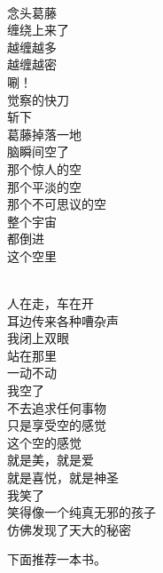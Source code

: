 \begin{poem}[斩]
    \begin{multicols}{4}
        \centering~\\
        念头葛藤 \\ 缠绕上来了 \\ 越缠越多 \\ 越缠越密 \\ 唰！ \\ 觉察的快刀 \\ 斩下 \\ 葛藤掉落一地 \\ 脑瞬间空了 \\ 那个惊人的空 \\ 那个平淡的空 \\ 那个不可思议的空 \\ 整个宇宙 \\ 都倒进 \\ 这个空里
    \end{multicols}
\end{poem}

\begin{poem}[笑]
    \begin{multicols}{4}
        \centering~\\
        人在走，车在开 \\ 耳边传来各种嘈杂声 \\ 我闭上双眼 \\ 站在那里 \\ 一动不动 \\ 我空了 \\ 不去追求任何事物 \\ 只是享受空的感觉 \\ 这个空的感觉 \\ 就是美，就是爱 \\ 就是喜悦，就是神圣 \\ 我笑了 \\ 笑得像一个纯真无邪的孩子 \\ 仿佛发现了天大的秘密
    \end{multicols}
\end{poem}

下面推荐一本书。

